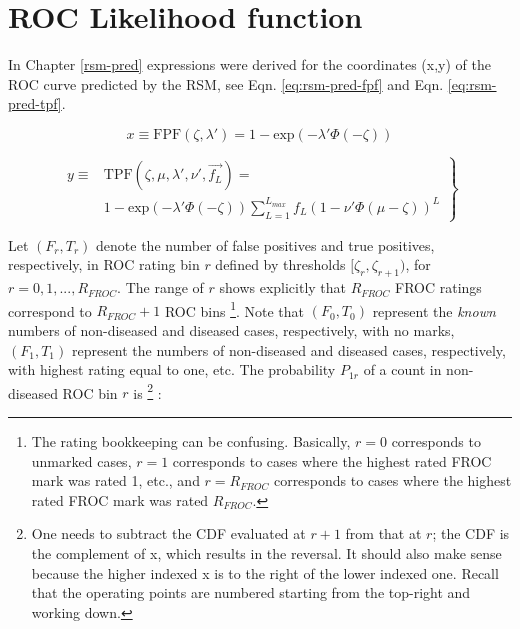 \documentclass[
]{book}
\begin{document}
\hypertarget{rsm-fitting-roc-likelihood}{%
\section{ROC Likelihood function}\label{rsm-fitting-roc-likelihood}}

In Chapter \ref{rsm-pred} expressions were derived for the coordinates (x,y) of the ROC curve predicted by the RSM, see Eqn. \eqref{eq:rsm-pred-fpf} and Eqn. \eqref{eq:rsm-pred-tpf}.

\begin{equation}
x \equiv \text{FPF}\left (\zeta , \lambda'\right ) = 1 - \text{exp}\left ( -\lambda' \Phi\left ( -\zeta \right )  \right )
\label{eq:rsm-fitting-fpf}
\end{equation}

\begin{equation}
\left.
\begin{aligned}
y \equiv & \text{TPF}\left (\zeta , \mu, \lambda', \nu', \overrightarrow{f_L} \right ) =  \\
& 1 - \text{exp}\left ( -\lambda' \Phi \left ( -\zeta \right )\right ) 
\sum_{L=1}^{L_{max}} f_L  \left ( 1 - \nu' \Phi \left ( \mu -\zeta \right ) \right )^L 
\end{aligned}
\right \}
\label{eq:rsm-fitting-tpf}
\end{equation}

Let \((F_r,T_r)\) denote the number of false positives and true positives, respectively, in ROC rating bin \(r\) defined by thresholds \([\zeta_r, \zeta_{r+1})\), for \(r = 0, 1, ..., R_{FROC}\). The range of \(r\) shows explicitly that \(R_{FROC}\) FROC ratings correspond to \(R_{FROC}+1\) ROC bins \footnote{The rating bookkeeping can be confusing. Basically, \(r = 0\) corresponds to unmarked cases, \(r = 1\) corresponds to cases where the highest rated FROC mark was rated 1, etc., and \(r = R_{FROC}\) corresponds to cases where the highest rated FROC mark was rated \(R_{FROC}\).}. Note that \((F_0,T_0)\) represent the \emph{known} numbers of non-diseased and diseased cases, respectively, with no marks, \((F_1,T_1)\) represent the numbers of non-diseased and diseased cases, respectively, with highest rating equal to one, etc. The probability \(P_{1r}\) of a count in non-diseased ROC bin \(r\) is \footnote{One needs to subtract the CDF evaluated at \(r+1\) from that at \(r\); the CDF is the complement of x, which results in the reversal. It should also make sense because the higher indexed x is to the right of the lower indexed one. Recall that the operating points are numbered starting from the top-right and working down.} :
\end{document}
